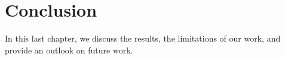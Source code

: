 \chapter{Conclusion}
\label{cap:conclusion}

In this last chapter, we discuss the results, the limitations of our work, and provide an outlook on future work. 
